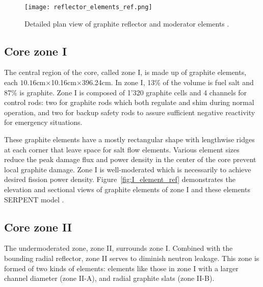 \begin{figure}[hbp!] %
  \centering
  \vspace{-0.3em}
  \texttt{[image: reflector\_elements\_ref.png]}
  \caption{Detailed plan view of graphite reflector and moderator elements \cite{robertson_conceptual_1971}.}
  \vspace{-0.6em}
  \label{fig:detail_plan_view}
\end{figure}
\FloatBarrier

\subsection{Core zone I}
The central region of the core, called zone I, is made up of graphite elements, each $10.16$cm$\times$10.16cm$\times$396.24cm. In zone I, 13\% of the volume is fuel salt and 87\% is graphite. Zone I is composed of 1'320 graphite cells and 4 channels for control rods: two for graphite rods which both regulate and shim during normal operation, and two for backup safety rods to assure sufficient negative reactivity for emergency situations.

These graphite elements have a mostly rectangular shape with lengthwise ridges 
at each corner that leave space for salt flow elements. Various element sizes 
reduce the peak damage flux and power density in the center of the core prevent 
local graphite damage. Zone I is well-moderated which is necessarily to achieve desired fission power density. Figure~\ref{fig:I_element_ref} demonstrates the elevation and sectional views of graphite elements of zone I \cite{robertson_conceptual_1971} and these elements SERPENT model \cite{rykhlevskii_full-core_2017}.

\subsection{Core zone II}
The undermoderated zone, zone II, surrounds zone I. Combined with the bounding radial reflector, zone II serves to diminish neutron leakage. This zone is formed of two kinds of elements: elements like those in zone I with a larger channel diameter (zone II-A), and radial graphite slats (zone II-B). 

